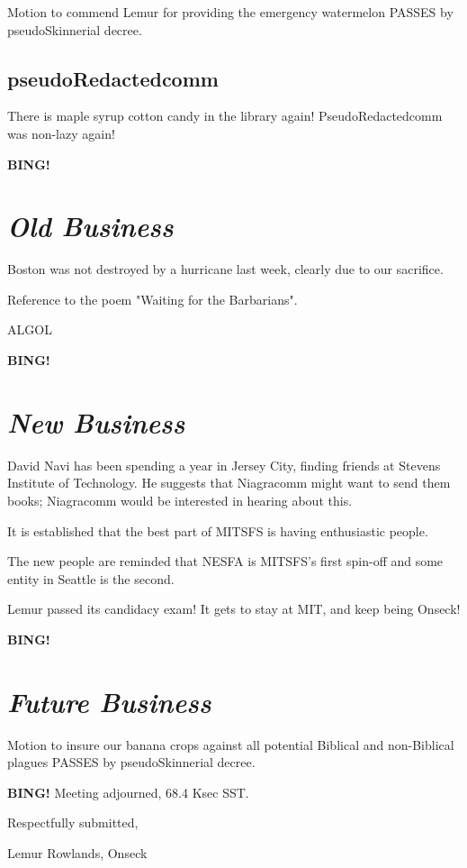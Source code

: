 \documentclass[10pt]{article}
\newcommand{\bing}{{\bf BING!} }
\newcommand{\goto}[1]{\bing \vskip 12pt \section*{{\em{#1}}}}
\newcommand{\onseck}{Lemur Rowlands, Onseck}
\begin{document}
Motion to commend Lemur for providing the emergency watermelon
PASSES by pseudoSkinnerial decree.


\subsection*{pseudoRedactedcomm}

There is maple syrup cotton candy in the library again!  PseudoRedactedcomm
was non-lazy again!


\goto{Old Business}

Boston was not destroyed by a hurricane last week, clearly due to
our sacrifice.

Reference to the poem "Waiting for the Barbarians".

ALGOL


\goto{New Business}

David Navi has been spending a year in Jersey City, finding friends at
Stevens Institute of Technology.  He suggests that Niagracomm might
want to send them books; Niagracomm would be interested in hearing
about this.

It is established that the best part of MITSFS is having
enthusiastic people.

The new people are reminded that NESFA is MITSFS's first
spin-off and some entity in Seattle is the second. 

Lemur passed its candidacy exam!  It gets to stay at MIT, and keep
being Onseck!

\goto{Future Business}

Motion to insure our banana crops against all potential Biblical
and non-Biblical plagues PASSES by pseudoSkinnerial decree.

\bing
\noindent
Meeting adjourned, 68.4 Ksec SST.

\vspace{18pt}

\centerline{Respectfully submitted,}
\centerline{\onseck}
\end{document}
